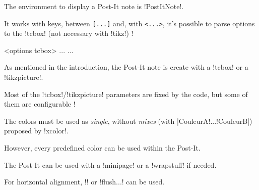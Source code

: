 \documentclass[english,a4paper,11pt]{article}
\begin{document}
\begin{cautionblock}
The environment to display a Post-It note is \packagetex!PostItNote!.

It works with keys, between \texttt{[...]} and, with \texttt{<...>}, it's possible to parse options to  the \motcletex!tcbox! (not necessary with \motcletex!tikz!) !
\end{cautionblock}

\begin{DemoCode}
\begin{PostIt}[keys]<options tcbox>
...
...
\end{PostIt}
\end{DemoCode}

\begin{noteblock}
As mentioned in the introduction, the Post-It note is create with a \motcletex!tcbox! or a  \motcletex!tikzpicture!.

Most of the \motcletex!tcbox!/\motcletex!tikzpicture! parameters are fixed by the code, but some of them are configurable !
\end{noteblock}

\begin{DemoCode}[]
\begin{PostItNote}
\lipsum[1][1-2]
\end{PostItNote}
\end{DemoCode}

\begin{DemoCode}[]
\begin{PostItNote}[Render=tikz]
\lipsum[1][1-2]
\end{PostItNote}
\begin{PostItNote}[Render=tikzv2]
\lipsum[1][1-2]
\end{PostItNote}
\end{DemoCode}

\begin{tipblock}
The colors must be used as \textit{single}, without \textit{mixes} (with \motcletex|CouleurA!...!CouleurB|) proposed by \packagetex!xcolor!. 


However, every predefined color can be used within the Post-It.
\end{tipblock}

\begin{tipblock}
The Post-It can be used with a \motcletex!minipage! or a \motcletex!wrapstuff! if needed.

For horizontal alignment, \motcletex!\hfill! or \motcletex!flush...! can be used.
\end{tipblock}
\end{document}
